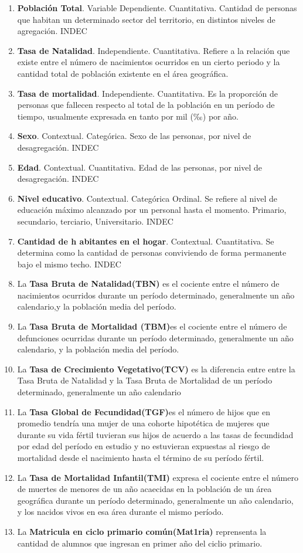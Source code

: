 \documentclass{article}
\theoremstyle{mytheoremstyle}
\theoremstyle{mytheoremstyle}
\theoremstyle{myproblemstyle}
\begin{document}
\begin{enumerate}
  \item \textbf{Población Total}. Variable Dependiente. Cuantitativa. Cantidad de personas que habitan un determinado sector del territorio, en distintos niveles de agregación. INDEC
  \item \textbf{Tasa de Natalidad}. Independiente. Cuantitativa. Refiere a la relación que existe entre el número de nacimientos ocurridos en un cierto periodo y la cantidad total de población existente en el área geográfica. 
  \item \textbf{Tasa de mortalidad}. Independiente. Cuantitativa. Es la proporción de personas que fallecen respecto al total de la población en un período de tiempo, usualmente expresada en tanto por mil (‰) por año.
  \item \textbf{Sexo}. Contextual. Categórica. Sexo de las personas, por nivel de desagregación. INDEC
  \item \textbf{Edad}. Contextual. Cuantitativa. Edad de las personas, por nivel de desagregación. INDEC
  \item\textbf{Nivel educativo}.  Contextual. Categórica Ordinal.  Se refiere al nivel de educación máximo alcanzado por un personal hasta el momento. Primario, secundario, terciario, Universitario. INDEC
  \item \textbf{Cantidad de h abitantes en el hogar}. Contextual. Cuantitativa.  Se determina como la cantidad de personas conviviendo de forma permanente bajo el mismo techo. INDEC
  \item La \textbf{Tasa Bruta de Natalidad(TBN)} es el cociente entre el número de nacimientos ocurridos durante un período determinado, 
  generalmente un año calendario,y la población media del período.
   \item	La  \textbf{Tasa Bruta de Mortalidad (TBM)}es el cociente entre el número de defunciones ocurridas durante un período determinado, 
   generalmente un año calendario, y la población media del período.
   \item La \textbf{Tasa de Crecimiento Vegetativo(TCV)} es la diferencia entre entre la Tasa Bruta de Natalidad 
   y la Tasa Bruta de Mortalidad de un período determinado, generalmente un año calendario
   \item  La \textbf{Tasa Global de Fecundidad(TGF)}es el número de hijos que en promedio tendría una mujer de
   una cohorte hipotética de mujeres que durante su vida fértil tuvieran sus hijos de acuerdo 
   a las tasas de fecundidad por edad del período en estudio y no estuvieran expuestas al
   riesgo de mortalidad desde el nacimiento hasta el término de su período fértil.
   \item La \textbf{Tasa de Mortalidad Infantil(TMI)} expresa el cociente entre el número de muertes de menores de un año acaecidas 
   en la población de un área geográfica durante un período determinado, 
   generalmente un año calendario, y los nacidos vivos en esa área durante el mismo período.
   \item La \textbf{Matricula en ciclo primario común(Mat1ria)} reprensenta la cantidad de alumnos
   que ingresan en primer año del ciclio primario.
\end{enumerate}
\end{document}
